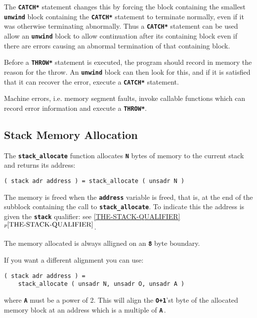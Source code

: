 \documentclass[12pt]{article}
\makeatletter
\newcommand{\TT}[1]{{\tt \bfseries #1}}
\newcommand{\ttkey}[1]{\TT{#1}\index{#1@{\tt #1}}}
\newcommand{\itemref}[1]{\ref{#1}$^{p\pageref{#1}}$}
\newenvironment{indpar}[1][0.3in]%
	{\begin{list}{}%
		     {\setlength{\itemsep}{0in}%
		      \setlength{\topsep}{0in}%
		      \setlength{\parsep}{1ex}%
		      \setlength{\labelwidth}{#1}%
		      \setlength{\leftmargin}{#1}%
		      \addtolength{\leftmargin}{\labelsep}}%
	 \item}%
	{\end{list}}
\makeatother
\begin{document}
The \TT{*CATCH*} statement changes this by forcing the block containing
the smallest \TT{unwind} block containing the \TT{*CATCH*} statement
to terminate normally, even if it was otherwise terminating abnormally.
Thus a \TT{*CATCH*} statement can be used allow an \TT{unwind} block
to allow continuation after its containing block even if there are
errors causing an abnormal termination of that containing block.

Before a \TT{*THROW*} statement is executed, the program should record
in memory the reason for the throw.  An \TT{unwind} block can then
look for this, and if it is satisfied that it can recover the error,
execute a \TT{*CATCH*} statement.

Machine errors, i.e. memory segment faults, invoke callable functions
which can record error information and execute a \TT{*THROW*}.


\subsection{Stack Memory Allocation}
\label{STACK-MEMORY-ALLOCATION}

The \ttkey{stack\_allocate} function allocates \TT{N} bytes of
memory to the current stack and returns its address:

\begin{indpar}\begin{verbatim}
( stack adr address ) = stack_allocate ( unsadr N )
\end{verbatim}\end{indpar}\label{STACK-ALLOCATE}

The memory is freed when the \TT{address} variable is freed, that is,
at the end of the subblock containing the call to \TT{stack\_allocate}.
To indicate this the address is given the \TT{stack} qualifier:
see \itemref{THE-STACK-QUALIFIER}.

The memory allocated is always alligned on an \TT{8} byte boundary.

If you want a different alignment you can use:

\begin{indpar}\begin{verbatim}
( stack adr address ) =
    stack_allocate ( unsadr N, unsadr O, unsadr A )
\end{verbatim}\end{indpar}

where \TT{A} must be a power of 2.  This will align the \TT{O+1}'st
byte of the allocated memory block
at an address which is a multiple of \TT{A}\,.
\end{document}
